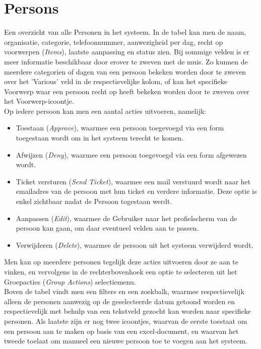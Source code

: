\documentclass[]{memoir}
\begin{document}
\section{Persons}
Een overzicht van alle Personen in het systeem. In de tabel kan men de naam, organisatie, categorie, telefoonnummer, aanwezigheid per dag, recht op voorwerpen (\textsl{Items}), laatste aanpassing en status zien. Bij sommige velden is er meer informatie beschikbaar door erover te zweven met de muis. Zo kunnen de meerdere categorien of dagen van een persoon bekeken worden door te zweven over het 'Various' veld in de respectievelijke kolom, of kan het specifieke Voorwerp waar een persoon recht op heeft bekeken worden door te zweven over het Voorwerp-icoontje.\\
Op iedere persoon kan men een aantal acties uitvoeren, namelijk:
\begin{itemize}
	\item Toestaan (\textsl{Approve}), waarmee een persoon toegevoegd via een form toegestaan wordt om in het systeem terecht te komen.
	\item Afwijzen  (\textsl{Deny}), waarmee een persoon toegevoegd via een form afgewezen wordt.
	\item Ticket versturen (\textsl{Send Ticket}), waarmee een mail verstuurd wordt naar het emailadres van de persoon met hun ticket en verdere informatie. Deze optie is enkel zichtbaar nadat de Persoon togestaan werdt.
	\item Aanpassen (\textsl{Edit}), waarmee de Gebruiker naar het profielscherm van de persoon kan gaan, om daar eventueel velden aan te passen.
	\item Verwijderen (\textsl{Delete}), waarmee de persoon uit het systeem verwijderd wordt.
\end{itemize}

Men kan op meerdere personen tegelijk deze acties uitvoeren door ze aan te vinken, en vervolgens in de rechterbovenhoek een optie te selecteren uit het Groepacties  (\textsl{Group Actions}) selectiemenu.\\
Boven de tabel vindt men een filters en een zoekbalk, waarmee respectievelijk alleen de personen aanwezig op de geselecteerde datum getoond worden en respectievelijk met behulp van een tekstveld gezocht kan worden naar specifieke personen. Als laatste zijn er nog twee icoontjes, waarvan de eerste toestaat om een persoon aan te maken op basis van een excel-document, en waarvan het tweede toelaat om manueel een nieuwe persoon toe te voegen aan het systeem.\\
\end{document}
